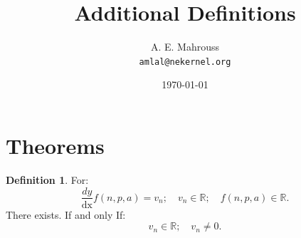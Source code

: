 \documentclass[10pt, twocolumn]{article}
\title{%
  \vspace{-1.5em}%
  \large\textbf{Additional Definitions}%
}
\author{A. E. Mahrouss\\\texttt{amlal@nekernel.org}}
\date{\today}
\theoremstyle{plain}
\theoremstyle{definition}
\newtheorem{definition}[theorem]{Definition}
\theoremstyle{remark}
\begin{document}
\twocolumn[{%
  \maketitle
  \vspace{-0.5em}
  \vspace{0.8em}
  \rule{\linewidth}{0.4pt}
  \vspace{1em}
}]

\section{Theorems}

\begin{definition}
  For:
  \begin{equation}
    \frac{dy}{\operatorname{dx}}f(n, p, a) = v_{n}; \quad v_{n} \in \mathbb{R}; \quad f(n, p, a) \in \mathbb{R}.
  \end{equation}
  There exists. If and only If:
  \begin{equation}
    v_{n} \in \mathbb{R}; \quad v_{n}\neq 0.
  \end{equation}
\end{definition}

\nocite{*}



\end{document}
